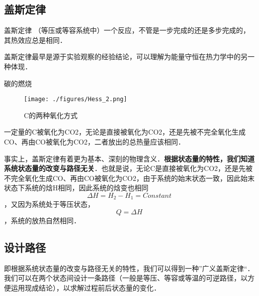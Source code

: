 
\subsection{盖斯定律}
\begin{theorem}{盖斯定律}
（等压或等容系统中）一个反应，不管是一步完成的还是多步完成的，其热效应总是相同．
\end{theorem}
盖斯定律最早是源于实验观察的经验结论，可以理解为能量守恒在热力学中的另一种体现．

\begin{example}{碳的燃烧}
\begin{figure}[ht]
\centering
\texttt{[image: ./figures/Hess\_2.png]}
\caption{C的两种氧化方式} \label{Hess_fig2}
\end{figure}
一定量的C被氧化为CO2，无论是直接被氧化为CO2，还是先被不完全氧化生成CO、再由CO被氧化为CO2，二者放出的总热量应该相同．
\end{example}

事实上，盖斯定律有着更为基本、深刻的物理含义．\textbf{根据状态量的特性，我们知道系统状态量的改变与路径无关}．也就是说，无论C是直接被氧化为CO2，还是先被不完全氧化生成CO、再由CO被氧化为CO2，由于系统的始末状态一致，因此始末状态下系统的焓H相同，因此系统的焓变也相同$$\Delta H=H_2-H_1=Constant$$，又因为系统处于等压状态，$$Q=\Delta H$$，系统的放热自然相同．

\subsection{设计路径}
即根据系统状态量的改变与路径无关的特性，我们可以得到一种”广义盖斯定律“．我们可以在两个状态间设计一条路径（一般是等压、等容或等温的可逆路径，以方便运用现成结论），以求解过程前后状态量的变化．
